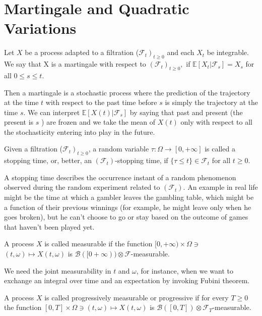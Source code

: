\section{Martingale and Quadratic Variations}

\begin{definition}
	Let $ X $ be a process adapted to a filtration ($\left.\mathcal{F}_{t}\right)_{t \geq 0}$ and each $X_t$ be integrable.
	We say that X is a martingale with respect to $\left(\mathcal{F}_{t}\right)_{t \geq 0},$ if  $\mathbb{E}[X_{t} | \mathcal{F}_{s}]=X_{s}$ for all $0 \leq s \leq t$.

	Then a martingale is a stochastic process where the prediction of the trajectory at the time $ t $ with respect to the past time before $ s $ is simply the trajectory at the time $ s $. We can interpret $\mathbb{E}\left[X(t) | \mathcal{F}_{s}\right]$ by saying that past and present (the present is $s$ ) are frozen and we take the mean of $X(t)$ only with respect to all the stochasticity entering into play in the future.
\end{definition}

\begin{definition}
	Given a filtration ($\left.\mathcal{F}_{t}\right)_{t \geq 0}$, a random variable $\tau: \Omega \rightarrow[0,+\infty]$ is called a stopping time, or, better, an $ (\mathcal{F}_{t}) $-stopping time, if $\{\tau \leq t\} \in \mathcal{F}_{t}$ for all $t \geq 0.$
\end{definition}


A stopping time describes the occurrence instant of a random phenomenon observed during the random experiment related to $\left(\mathcal{F}_{t}\right)$.
An example in real life might be the time at which a gambler leaves the gambling table, which might be a function of their previous winnings (for example, he might leave only when he goes broken), but he can't choose to go or stay based on the outcome of games that haven't been played yet.
\begin{definition}
	A process $X$ is called measurable if the function $[0,+\infty) \times \Omega \ni$ $(t, \omega) \mapsto X(t, \omega)$ is $\mathcal{B}([0+\infty)) \otimes \mathcal{F}$-measurable.
\end{definition}
We need the joint measurability in $t$ and $\omega$, for instance, when we want to exchange an integral over time and an expectation by invoking Fubini theorem.
\begin{definition}
	A process $X$ is called progressively measurable or progressive if for every $T \geq 0$ the function $[0, T] \times \Omega \ni(t, \omega) \mapsto X(t, \omega)$ is $\mathcal{B}([0, T]) \otimes \mathcal{F}_{T}$-measurable.
\end{definition}

